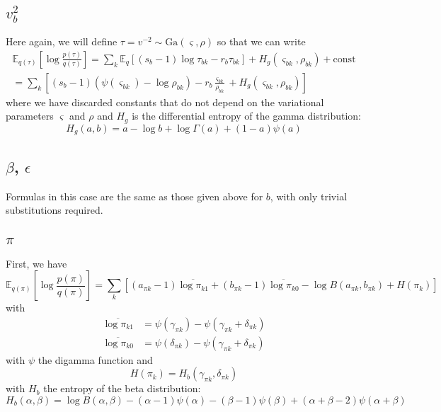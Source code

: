 \documentclass[11pt]{article}
\begin{document}
\subsection{$v^2_b$}
Here again, we will define $\tau = v^{-2} \sim \mathrm{Ga}(\varsigma, \rho)$ so that we can write
\begin{multline}
    \mathbb{E}_{q(\tau)}\left[\log \frac{p(\tau)}{q(\tau)}\right] =
    \sum_k \mathbb{E}_q \left[
    (s_{b} - 1) \log \tau_{bk} - r_{b} \tau_{bk} \right]
    + H_g(\varsigma_{bk}, \rho_{bk})
    + \mathrm{const} \\
    = \sum_k \left[
    (s_{b} - 1) (\psi(\varsigma_{bk}) - \log \rho_{bk})
    - r_{b} \frac{\varsigma_{bk}}{\rho_{bk}} + H_g(\varsigma_{bk}, \rho_{bk})
    \right]
\end{multline}
where we have discarded constants that do not depend on the variational parameters $\varsigma$ and $\rho$ and $H_g$ is the differential entropy of the gamma distribution:
\begin{equation}
    H_g(a, b) = a - \log b + \log \Gamma(a) + (1 - a)\psi(a)
\end{equation}

\subsection{$\beta$, $\epsilon$}
Formulas in this case are the same as those given above for $b$, with only trivial substitutions required.

\subsection{$\pi$}
First, we have
\begin{equation}
    \mathbb{E}_{q(\pi)} \left[\log \frac{p(\pi)}{q(\pi)} \right] = \sum_k \left[(a_{\pi k} - 1)\overline{\log \pi_{k1}} + (b_{\pi k} - 1) \overline{\log \pi_{k0}} - \log B(a_{\pi k}, b_{\pi k}) + H(\pi_k) \right]
\end{equation}
with
\begin{align}
    \overline{\log \pi_{k1}} &= \psi(\gamma_{\pi k}) - \psi(\gamma_{\pi k} + \delta_{\pi k}) \\
    \overline{\log \pi_{k0}} &= \psi(\delta_{\pi k}) - \psi(\gamma_{\pi k} + \delta_{\pi k})
\end{align}
with $\psi$ the digamma function and
\begin{equation}
    H(\pi_k) = H_b(\gamma_{\pi k}, \delta_{\pi k})
\end{equation}
with $H_b$ the entropy of the beta distribution:
\begin{equation}
    H_b(\alpha, \beta) = \log B(\alpha, \beta) - (\alpha - 1) \psi(\alpha) - (\beta - 1) \psi(\beta) + (\alpha + \beta - 2)\psi(\alpha + \beta)
\end{equation}
\end{document}
